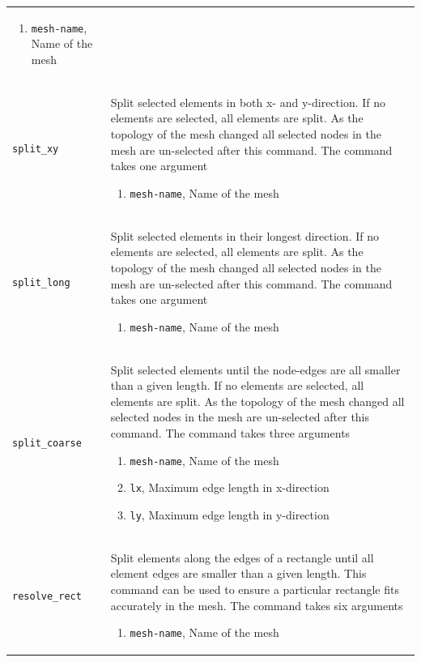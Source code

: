\documentclass[noshowpacs,preprintnumbers,amsmath,amssymb, letter]{revtex4}
\begin{document}
\begin{longtable}{p{}p{}}
\begin{enumerate}
\item \texttt{mesh-name}, Name of the mesh
\end{enumerate}\\
\texttt{split\_xy}	& Split selected elements in both x- and y-direction. If no elements are selected, all elements are split. As the topology of the mesh changed all selected nodes in the mesh are un-selected after this command. The command takes one argument 
\begin{enumerate}
\item \texttt{mesh-name}, Name of the mesh
\end{enumerate}\\
\texttt{split\_long}	& Split selected elements in their longest direction. If no elements are selected, all elements are split. As the topology of the mesh changed all selected nodes in the mesh are un-selected after this command. The command takes one argument 
\begin{enumerate}
\item \texttt{mesh-name}, Name of the mesh
\end{enumerate}\\
\texttt{split\_coarse}	& Split selected elements until the node-edges are all smaller than a given length. If no elements are selected, all elements are split. As the topology of the mesh changed all selected nodes in the mesh are un-selected after this command. The command takes three arguments 
\begin{enumerate}
\item \texttt{mesh-name}, Name of the mesh
\item \texttt{lx}, Maximum edge length in x-direction
\item \texttt{ly}, Maximum edge length in y-direction
\end{enumerate}\\
\texttt{resolve\_rect}	& Split elements along the edges of a rectangle until all element edges are smaller than a given length. This command can be used to ensure a particular rectangle fits accurately in the mesh. The command takes six arguments 
\begin{enumerate}
\item \texttt{mesh-name}, Name of the mesh

\end{enumerate}
\end{longtable}
\end{document}
